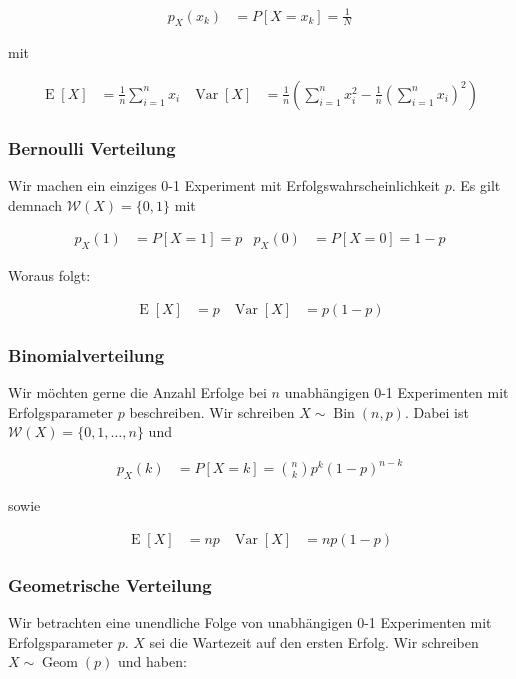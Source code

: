 \documentclass[25pt]{sciposter}
\newcommand{\W}{\mathcal{W}}
\newcommand{\Var}{\operatorname{Var}}
\newcommand{\E}{\operatorname{E}}
\begin{document}
\begin{multicols}{3}
\begin{align*}
	p_X(x_k) &= P[X = x_k] = \frac{1}{N}
\end{align*}

mit 

\begin{align*}
	\operatorname {E}[X]&={\frac  {1}{n}}\sum _{{i=1}}^{n}x_{i} & \operatorname {Var}[X]&={\frac  {1}{n}}\left(\sum _{{i=1}}^{n}x_{i}^{2}-{\frac  {1}{n}}\left(\sum _{{i=1}}^{n}x_{i}\right)^{2}\right)
\end{align*}

\subsubsection*{Bernoulli Verteilung}
Wir machen ein einziges 0-1 Experiment mit Erfolgswahrscheinlichkeit $p$. Es gilt demnach $\W(X) = \{0,1\}$ mit 

\begin{align*}
	p_X(1) &= P[X=1] = p & 	p_X(0) &= P[X=0] = 1-p
\end{align*}

Woraus folgt:

\begin{align*}
	\E[X] &= p & \Var[X] &= p(1-p)
\end{align*}

\subsubsection*{Binomialverteilung}
Wir möchten gerne die Anzahl Erfolge bei $n$ unabhängigen 0-1 Experimenten mit Erfolgsparameter $p$ beschreiben. Wir schreiben $X \sim \operatorname{Bin}(n,p)$. Dabei ist $\W(X) = \{0,1,\ldots,n\}$ und 

\begin{align*}
	p_X(k) &= P[X=k] = {n \choose k} p^k (1-p)^{n-k}
\end{align*}

sowie 

\begin{align*}
	\E[X] &= np & \Var[X] &= np(1-p)
\end{align*}


\subsubsection*{Geometrische Verteilung}
Wir betrachten eine unendliche Folge von unabhängigen 0-1 Experimenten mit Erfolgsparameter $p$. $X$ sei die Wartezeit auf den ersten Erfolg. Wir schreiben $X\sim\operatorname{Geom}(p)$ und haben:


\end{multicols}
\end{document}
